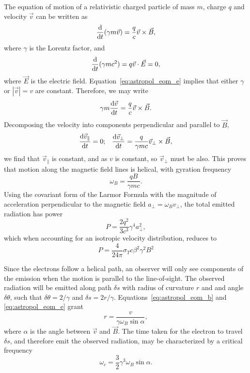 The equation of motion of a relativistic charged particle of mass $m$, charge $q$ and velocity $\vec{v}$ can be written as 
\begin{equation}
\frac{{\rm d}}{{\rm d}t}(\gamma m \vec{v}) = \frac{q}{c}\vec{v}\times\vec{B},
\label{eq:astropol_eom_b}
\end{equation}
where $\gamma$ is the Lorentz factor, and
\begin{equation}
\frac{{\rm d}}{{\rm d}t}(\gamma m c^2) =q \vec{v}\cdot\vec{E} = 0,
\label{eq:astropol_eom_e}
\end{equation}
where $\vec{E}$ is the electric field. Equation~\ref{eq:astropol_eom_e} implies that either $\gamma$ or $|\vec{v}|=v$ are constant. Therefore, we may write
\begin{equation}
\gamma m\frac{{\rm d}\vec{v}}{{\rm d}t} = \frac{q}{c}\vec{v}\times\vec{B}.
\end{equation}
Decomposing the velocity into components perpendicular and parallel to $\vec{B}$,
\begin{equation}
\frac{{\rm d}\vec{v}_{\parallel}}{{\rm d}t} = 0;\,\,\,\,\,\frac{{\rm d}\vec{v}_{\perp}}{{\rm d}t} = \frac{q}{\gamma m c} \vec{v}_{\perp}\times\vec{B},
\end{equation}
we find that $\vec{v}_{\parallel}$ is constant, and as $v$ is constant, so $\vec{v}_{\perp}$ must be also. This proves that motion along the magnetic field lines is helical, with gyration frequency
\begin{equation}
\omega_B = \frac{qB}{\gamma m c}.
\end{equation}
Using the covariant form of the Larmor Formula with the magnitude of acceleration perpendicular to the magnetic field $a_{\perp} = \omega_B v_{\perp}$, the total emitted radiation has power
\begin{equation}
P = \frac{2 q^2}{3c^3}\gamma^4 a_{\perp}^2,
\end{equation}
which when accounting for an isotropic velocity distribution, reduces to
\begin{equation}
P = \frac{4}{24\pi}\sigma_T c \beta^2 \gamma^2 B^2
\end{equation}

Since the electrons follow a helical path, an observer will only see components of the emission when the motion is parallel to the line-of-sight. The observed radiation will be emitted along path $\delta s$ with radius of curvature $r$ and and angle $\delta \theta$, such that $\delta\theta = 2/\gamma$ and $\delta s = 2r/\gamma$. Equations~\ref{eq:astropol_eom_b} and \ref{eq:astropol_eom_e} grant
\begin{equation}
r = \frac{v}{\gamma\omega_B\sin\alpha},
\end{equation}
where $\alpha$ is the angle between $\vec{v}$ and $\vec{B}$. The time taken for the electron to travel $\delta s$, and therefore emit the observed radiation, may be characterized by a critical frequency
\begin{equation}
\omega_c = \frac{3}{2}\gamma^3\omega_B\sin\alpha.
\end{equation}

